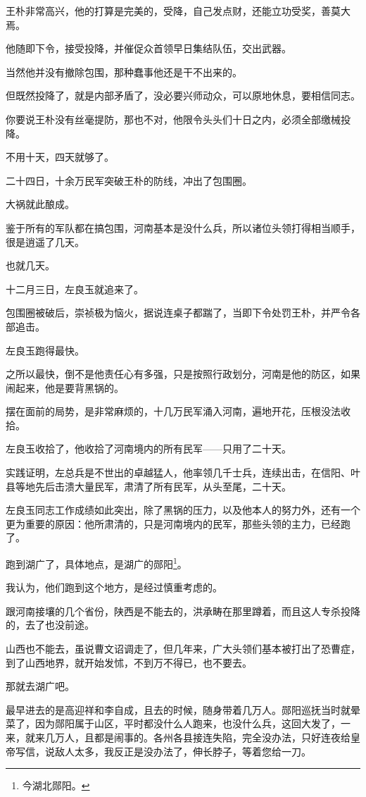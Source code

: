 \begin{multicols}{\theparacolNo}
		王朴非常高兴，他的打算是完美的，受降，自己发点财，还能立功受奖，善莫大焉。

		他随即下令，接受投降，并催促众首领早日集结队伍，交出武器。

		当然他并没有撤除包围，那种蠢事他还是干不出来的。

		但既然投降了，就是内部矛盾了，没必要兴师动众，可以原地休息，要相信同志。

		你要说王朴没有丝毫提防，那也不对，他限令头头们十日之内，必须全部缴械投降。

		不用十天，四天就够了。

		二十四日，十余万民军突破王朴的防线，冲出了包围圈。

		大祸就此酿成。

		鉴于所有的军队都在搞包围，河南基本是没什么兵，所以诸位头领打得相当顺手，很是逍遥了几天。

		也就几天。

		十二月三日，左良玉就追来了。

		包围圈被破后，崇祯极为恼火，据说连桌子都踹了，当即下令处罚王朴，并严令各部追击。

		左良玉跑得最快。

		之所以最快，倒不是他责任心有多强，只是按照行政划分，河南是他的防区，如果闹起来，他是要背黑锅的。

		摆在面前的局势，是非常麻烦的，十几万民军涌入河南，遍地开花，压根没法收拾。

		左良玉收拾了，他收拾了河南境内的所有民军——只用了二十天。

		实践证明，左总兵是不世出的卓越猛人，他率领几千士兵，连续出击，在信阳、叶县等地先后击溃大量民军，肃清了所有民军，从头至尾，二十天。

		左良玉同志工作成绩如此突出，除了黑锅的压力，以及他本人的努力外，还有一个更为重要的原因：他所肃清的，只是河南境内的民军，那些头领的主力，已经跑了。

		跑到湖广了，具体地点，是湖广的郧阳\footnote{今湖北郧阳。}。

		我认为，他们跑到这个地方，是经过慎重考虑的。

		跟河南接壤的几个省份，陕西是不能去的，洪承畴在那里蹲着，而且这人专杀投降的，去了也没前途。

		山西也不能去，虽说曹文诏调走了，但几年来，广大头领们基本被打出了恐曹症，到了山西地界，就开始发怵，不到万不得已，也不要去。

		那就去湖广吧。

		最早进去的是高迎祥和李自成，且去的时候，随身带着几万人。郧阳巡抚当时就晕菜了，因为郧阳属于山区，平时都没什么人跑来，也没什么兵，这回大发了，一来，就来几万人，且都是闹事的。各州各县接连失陷，完全没办法，只好连夜给皇帝写信，说敌人太多，我反正是没办法了，伸长脖子，等着您给一刀。


\end{multicols}
